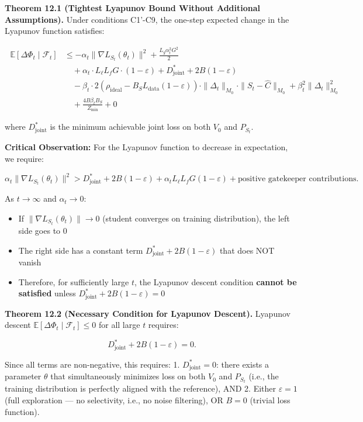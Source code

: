 \documentclass[
  12pt,
]{article}
\providecommand{\tightlist}{%
  \setlength{\itemsep}{0pt}\setlength{\parskip}{0pt}}
\begin{document}
\textbf{Theorem 12.1 (Tightest Lyapunov Bound Without Additional
Assumptions).} Under conditions C1'-C9, the one-step expected change in
the Lyapunov function satisfies:

\[\boxed{\;\begin{aligned}
\mathbb{E}[\Delta\Phi_t \mid \mathcal{F}_t] &\leq -\alpha_t \|\nabla L_{S_t}(\theta_t)\|^2 + \frac{L_g \alpha_t^2 G^2}{2} \\
&\quad + \alpha_t \cdot L_\ell L_f G \cdot (1 - \varepsilon) + D_{\text{joint}}^* + 2B(1-\varepsilon) \\
&\quad - \beta_t \cdot 2(\rho_{\text{ideal}} - B_S L_{\text{data}}(1-\varepsilon)) \cdot \|\Delta_t\|_{M_0} \cdot \|S_t - \hat{C}\|_{M_0} + \beta_t^2 \|\Delta_t\|_{M_0}^2 \\
&\quad + \frac{4B \beta_t B_S}{Z_{\min}} + 0
\end{aligned}}\]

where \(D_{\text{joint}}^*\) is the minimum achievable joint loss on
both \(V_0\) and \(P_{S_t}\).

\textbf{Critical Observation:} For the Lyapunov function to decrease in
expectation, we require:

\[\alpha_t \|\nabla L_{S_t}(\theta_t)\|^2 > D_{\text{joint}}^* + 2B(1-\varepsilon) + \alpha_t L_\ell L_f G(1-\varepsilon) + \text{positive gatekeeper contributions}.\]

As \(t \to \infty\) and \(\alpha_t \to 0\):

\begin{itemize}
\tightlist
\item
  If \(\|\nabla L_{S_t}(\theta_t)\| \to 0\) (student converges on
  training distribution), the left side goes to 0
\item
  The right side has a constant term
  \(D_{\text{joint}}^* + 2B(1-\varepsilon)\) that does NOT vanish
\item
  Therefore, for sufficiently large \(t\), the Lyapunov descent
  condition \textbf{cannot be satisfied} unless
  \(D_{\text{joint}}^* + 2B(1-\varepsilon) = 0\)
\end{itemize}

\textbf{Theorem 12.2 (Necessary Condition for Lyapunov Descent).}
Lyapunov descent \(\mathbb{E}[\Delta\Phi_t \mid \mathcal{F}_t] \leq 0\)
for all large \(t\) requires:

\[D_{\text{joint}}^* + 2B(1-\varepsilon) = 0.\]

Since all terms are non-negative, this requires: 1.
\(D_{\text{joint}}^* = 0\): there exists a parameter \(\theta\) that
simultaneously minimizes loss on both \(V_0\) and \(P_{S_t}\) (i.e., the
training distribution is perfectly aligned with the reference), AND 2.
Either \(\varepsilon = 1\) (full exploration --- no selectivity, i.e.,
no noise filtering), OR \(B = 0\) (trivial loss function).
\end{document}
